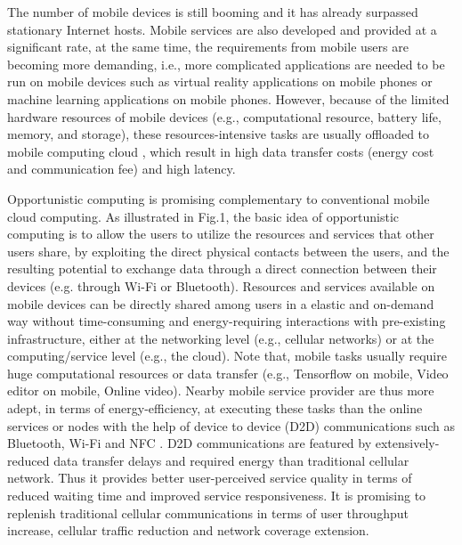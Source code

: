\documentclass[journal]{IEEEtran}
\begin{document}
The number of mobile devices is still booming and it has already surpassed stationary Internet hosts.
Mobile services are also developed and provided at a significant rate, at the same time, the requirements from mobile users are becoming more demanding, i.e., more complicated applications are needed to be run on mobile devices such as virtual reality applications on mobile phones \cite{bastug2017toward} or machine learning applications \cite{abadi2016tensorflow} on mobile phones. However, because of the limited hardware resources of mobile devices (e.g., computational resource, battery life, memory, and storage), these resources-intensive tasks are usually offloaded to mobile computing cloud \cite{dinh2013survey}, which result in high data transfer costs (energy cost and communication fee) and high latency.

Opportunistic computing is promising complementary to conventional mobile cloud computing. As illustrated in Fig.1, the basic idea of opportunistic computing is to allow the users to utilize the resources and services that other users share, by exploiting the direct physical contacts between the users, and the resulting potential to exchange data through a direct connection between their devices (e.g. through Wi-Fi or Bluetooth). Resources and services available on mobile devices can be directly shared among users in a elastic and on-demand way without time-consuming and energy-requiring interactions with pre-existing infrastructure, either at the networking level (e.g., cellular networks) or at the computing/service level (e.g., the cloud). 
Note that, mobile tasks usually require huge computational resources or data transfer (e.g., Tensorflow on mobile, Video editor on mobile, Online video). Nearby mobile service provider are thus more adept, in terms of energy-efficiency, at executing these tasks than the online services or nodes with the help of device to device (D2D) communications such as Bluetooth, Wi-Fi and NFC \cite{balani2007energy}. D2D communications are featured by extensively-reduced data transfer delays and required energy than traditional cellular network. Thus it provides better user-perceived service quality in terms of reduced waiting time and improved service responsiveness. It is promising to replenish traditional cellular communications in terms of user throughput increase, cellular traffic reduction and network coverage extension. 
\end{document}
